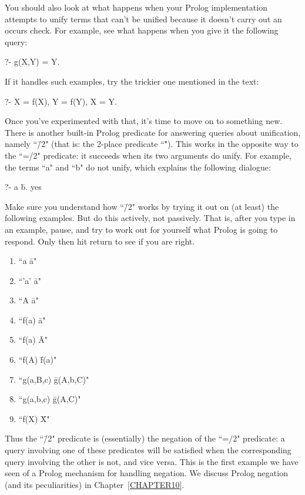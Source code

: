You should also look at what happens when your Prolog implementation
attempts to unify terms that can't be unified because it doesn't carry
out an occurs check. For example, see what happens when you give it
the following query:
\begin{LPNcodedisplay}
?- g(X,Y) = Y.
\end{LPNcodedisplay}
If it handles such examples, try the trickier one mentioned in the text:
\begin{LPNcodedisplay}
?- X = f(X), Y = f(Y), X = Y.
\end{LPNcodedisplay}

Once you've experimented with that, it's time to move on to something
new.  There is another built-in Prolog predicate for
answering queries about unification, namely ``\=/2" (that is: the
2-place predicate ``\=").   This works
in the opposite way to the ``=/2" predicate: it succeeds when its two
arguments do  unify.  For example, the terms ``a" and ``b"
do not unify, which explains the following dialogue:
\begin{LPNcodedisplay}
?- a \= b.
yes
\end{LPNcodedisplay}

Make sure you understand how  ``\=/2" works by trying it
out on (at least) the following examples.  But do this actively, not
passively.  That is, after you type in an example, pause, and try to
work out for yourself what Prolog is going to respond. Only then hit
return to see if you are right.
\begin{enumerate}
\item{}``a \= a"
\item{}``'a' \= a"
\item{}``A \= a"
\item{}``f(a) \= a"
\item{}``f(a) \= A"
\item{}``f(A) \= f(a)"
\item{}``g(a,B,c) \= g(A,b,C)"
\item{}``g(a,b,c) \= g(A,C)"
\item{}``f(X) \= X"
\end{enumerate}

Thus the ``\=/2" predicate is (essentially) the negation of
the ``=/2" predicate: a query involving one of these predicates will be
satisfied when the corresponding query involving the other is not, and
vice versa. This is the first example we have seen of a Prolog
mechanism for handling negation.  We discuss Prolog negation (and its
peculiarities) in Chapter~\ref{CHAPTER10}.

